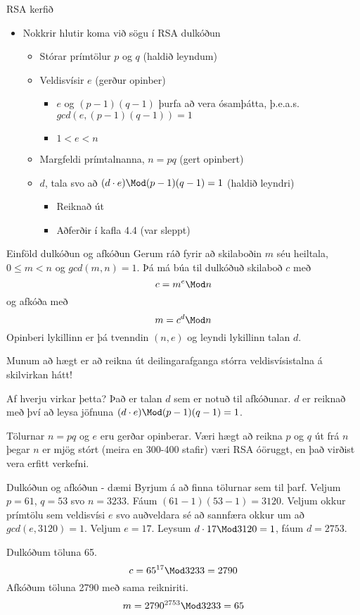 \documentclass[handout]{beamer}
\begin{document}
\begin{frame}{RSA kerfið}
\begin{itemize}
 \item Nokkrir hlutir koma við sögu í RSA dulkóðun
 \begin{itemize}
  \item Stórar prímtölur $p$ og $q$ (haldið leyndum)
  \item Veldisvísir $e$ (gerður opinber)
  \begin{itemize}
   \item $e$ og $(p-1)(q-1)$ þurfa að vera ósamþátta, þ.e.a.s. $gcd(e, (p-1)(q-1)) = 1$
   \item $1 < e < n$
  \end{itemize}
  \item Margfeldi prímtalnanna, $n = pq$ (gert opinbert)
  \item $d$, tala svo að $(d\cdot e) \Mod (p-1)(q-1) = 1$ (haldið leyndri)
  \begin{itemize}
   \item Reiknað út
   \item Aðferðir í kafla 4.4 (var sleppt)
  \end{itemize}
 \end{itemize}
\end{itemize}
\end{frame}

\begin{frame}{Einföld dulkóðun og afkóðun}
Gerum ráð fyrir að skilaboðin $m$ séu heiltala, $0 \leq m < n$ og $gcd(m, n) = 1$. Þá má búa til dulkóðuð skilaboð $c$ með
\[
c = m^e \Mod n
\]
og afkóða með 
\[
 m = c^d \Mod n
\]
Opinberi lykillinn er þá tvenndin $(n, e)$ og leyndi lykillinn talan $d$.

Munum að hægt er að reikna út deilingarafganga stórra veldisvísistalna á skilvirkan hátt!
\end{frame}

\begin{frame}{Af hverju virkar þetta?}
Það er talan $d$ sem er notuð til afkóðunar. $d$ er reiknað með því að leysa jöfnuna $(d\cdot e) \Mod (p-1)(q-1) = 1$.

Tölurnar $n = pq$ og $e$ eru gerðar opinberar. Væri hægt að reikna $p$ og $q$ út frá $n$ þegar $n$ er mjög stórt (meira en 300-400 stafir) væri RSA óöruggt, en það virðist vera erfitt verkefni.
\end{frame}

\begin{frame}{Dulkóðun og afkóðun - dæmi}
Byrjum á að finna tölurnar sem til þarf. Veljum $p=61$, $q = 53$ svo $n = 3233$. Fáum $(61 - 1)(53 - 1) = 3120$. Veljum okkur prímtölu sem veldisvísi $e$ svo auðveldara sé að sannfæra okkur um að $gcd(e,3120)=1$. Veljum $e = 17$. Leysum $d \cdot 17 \Mod 3120 = 1$, fáum $d = 2753$.

Dulkóðum töluna 65.
\[
 c = 65^{17} \Mod 3233 = 2790
\]
Afkóðum töluna 2790 með sama reikniriti.
\[
 m = 2790^{2753} \Mod 3233 = 65
\]
\end{frame}
\end{document}

